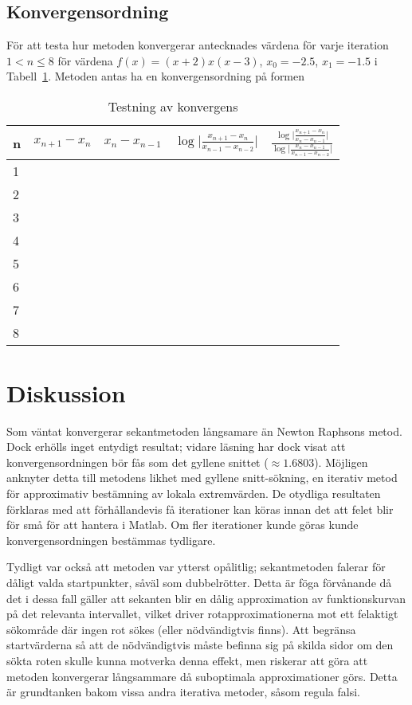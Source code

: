 \documentclass{article}
\begin{document}
\subsection{Konvergensordning}
För att testa hur metoden konvergerar antecknades värdena för varje iteration $1 < n \leq 8$ för värdena $f(x)=(x+2) x (x-3)$, $x_0=-2.5$, $x_1=-1.5$ i Tabell~\ref{konvergens}. Metoden antas ha en konvergensordning på formen 

\begin{table}[H]
  \begin{tabu}{l l l l l}
    n & $x_{n+1}-x_n$ & $x_n-x_{n-1}$ & $\log\lvert\frac{x_{n+1}-x_n}{x_{n-1}-x_{n-2}}\rvert$ & $\frac{\log\lvert\frac{x_{n+1}-x_n}{x_n-x_{n-1}}\rvert}{\log\lvert\frac{x_n-x_{n-1}}{x_{n-1}-x_{n-2}}\rvert}$\\
     \\
    2 \\
    3 \\
    4 \\
    5 \\
    6 \\
    7 \\
    8 \\
  \end{tabu}
  \caption{Testning av konvergens}\label{konvergens}
\end{table}

\section{Diskussion}
Som väntat konvergerar sekantmetoden långsamare än Newton Raphsons metod. Dock erhölls inget entydigt resultat; vidare läsning har dock visat att konvergensordningen bör fås som det gyllene snittet ($\approx 1.6803$). Möjligen anknyter detta till metodens likhet med gyllene snitt-sökning, en iterativ metod för approximativ bestämning av lokala extremvärden. De otydliga resultaten förklaras med att förhållandevis få iterationer kan köras innan det att felet blir för små för att hantera i Matlab. Om fler iterationer kunde göras kunde konvergensordningen bestämmas tydligare.

Tydligt var också att metoden var ytterst opålitlig; sekantmetoden falerar för dåligt valda startpunkter, såväl som dubbelrötter. Detta är föga förvånande då det i dessa fall gäller att sekanten blir en dålig approximation av funktionskurvan på det relevanta intervallet, vilket driver rotapproximationerna mot ett felaktigt sökområde där ingen rot sökes (eller nödvändigtvis finns). Att begränsa startvärderna så att de nödvändigtvis måste befinna sig på skilda sidor om den sökta roten skulle kunna motverka denna effekt, men riskerar att göra att metoden konvergerar långsammare då suboptimala approximationer görs. Detta är grundtanken bakom vissa andra iterativa metoder, såsom regula falsi.
\end{document}
